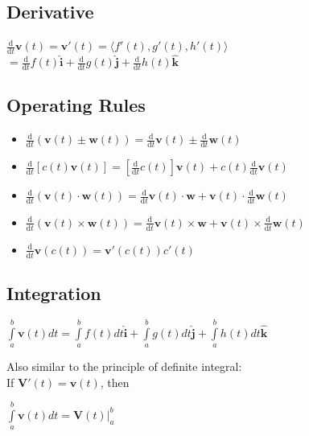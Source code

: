 \documentclass[UTF8,a4paper, 10pt, openany]{book}
\begin{document}
\subsection{Derivative}
\begin{center}
$\frac{\mathrm d}{\mathrm d t}\mathbf{v}(t)=\mathbf{v}'(t)=\langle f'(t),g'(t),h'(t) \rangle$\\
$=\frac{\mathrm d}{\mathrm d t}f(t)\mathbf{\hat{i}}+\frac{\mathrm d}{\mathrm d t}g(t)\mathbf{\hat{j}}+\frac{\mathrm d}{\mathrm d t}h(t)\mathbf{\hat{k}}$
\end{center}
\subsection{Operating Rules}
\begin{itemize}
\item $\frac{\mathrm d}{\mathrm d t}(\mathbf{v}(t)\pm \mathbf{w}(t))=\frac{\mathrm d}{\mathrm d t}\mathbf{v}(t)\pm \frac{\mathrm d}{\mathrm d t}\mathbf{w}(t)$
\item $\frac{\mathrm d}{\mathrm d t}[c(t)\mathbf{v}(t)]=[\frac{\mathrm d}{\mathrm d t}c(t)]\mathbf{v}(t)+c(t)\frac{\mathrm d}{\mathrm d t}\mathbf{v}(t)$
\item $\frac{\mathrm d}{\mathrm d t}(\mathbf{v}(t)\cdot \mathbf{w}(t))=\frac{\mathrm d}{\mathrm d t}\mathbf{v}(t)\cdot \mathbf{w}+\mathbf{v}(t)\cdot \frac{\mathrm d}{\mathrm d t}\mathbf{w}(t)$
\item $\frac{\mathrm d}{\mathrm d t}(\mathbf{v}(t)\times \mathbf{w}(t))=\frac{\mathrm d}{\mathrm d t}\mathbf{v}(t)\times \mathbf{w}+\mathbf{v}(t)\times \frac{\mathrm d}{\mathrm d t}\mathbf{w}(t)$
\item $\frac{\mathrm d}{\mathrm d t}\mathbf{v}(c(t))=\mathbf{v}'(c(t))c'(t)$
\end{itemize}
\subsection{Integration}
\begin{center}
$\displaystyle\int\limits_a^b \mathbf{v}(t)dt=\displaystyle\int\limits_a^b f(t)dt \mathbf{\hat{i}}+\displaystyle\int\limits_a^b g(t)dt \mathbf{\hat{j}}+\displaystyle\int\limits_a^b h(t)dt \mathbf{\hat{k}}$
\end{center}
Also similar to the principle of definite integral:\\
If $\mathbf{V}'(t)=\mathbf{v}(t)$, then
\begin{center}
$\displaystyle\int\limits_a^b \mathbf{v}(t)dt=\mathbf{V}(t) |_{a}^b$
\end{center}
\end{document}
